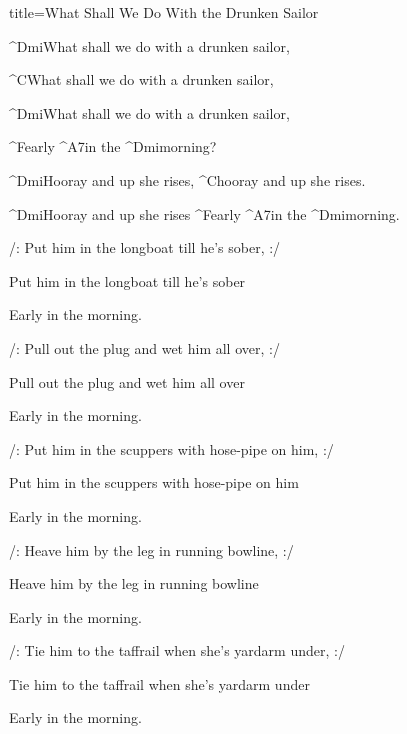 \begin{song}{title=\predtitle\centering What Shall We Do With the Drunken Sailor \\\large   \vspace*{-0.3cm}}  %
\begin{centerjustified}

\sloka 
	^{Dmi}What shall we do with a drunken sailor, 
	
	^{C\z }What shall we do with a drunken sailor, 

	^{Dmi}What shall we do with a drunken sailor, 
	
	^{F\z }early ^{A7}in the ^{Dmi\z }morning? 


	^{Dmi\z }Hooray and up she rises, ^{C\z }hooray and up she rises. 
	
	^{Dmi\z }Hooray and up she rises ^{F\z }early ^{A7}in the ^{Dmi\z }morning. 


\sloka
	/: Put him in the longboat till he's sober, :/ 

	Put him in the longboat till he's sober

	Early in the morning. 



\sloka
	/: Pull out the plug and wet him all over, :/ 
	
	Pull out the plug and wet him all over
	
	Early in the morning. 


\sloka
	/: Put him in the scuppers with hose-pipe on him, :/ 
	
	Put him in the scuppers with hose-pipe on him
	
	Early in the morning. 


\sloka
	/: Heave him by the leg in running bowline, :/ 
	
	Heave him by the leg in running bowline
	
	Early in the morning. 


\sloka
	/: Tie him to the taffrail when she's yardarm under, :/ 
	
	Tie him to the taffrail when she's yardarm under
	
	Early in the morning. 


\end{centerjustified}
\setcounter{Slokočet}{0}
\end{song}
